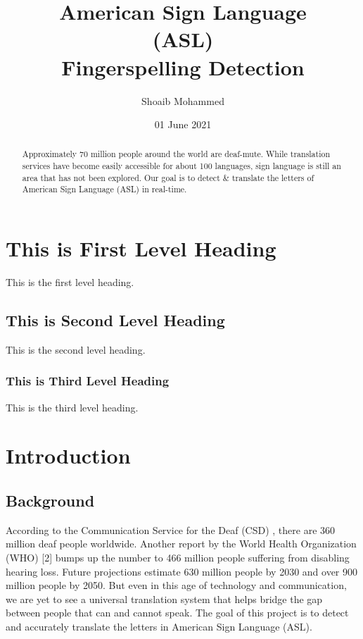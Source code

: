 \documentclass[twocolumn]{article}
\title{American Sign Language\\
	(ASL)\\
	Fingerspelling Detection}
\author{Shoaib Mohammed}
\date{01 June 2021}
\begin{document}
\begin{titlepage}
\maketitle
\thispagestyle{empty}
\end{titlepage}

\begin{abstract}
	Approximately 70 million people around the world are deaf-mute. While 
	translation services have become easily accessible for about 100 
	languages, sign language is still an area that has not been explored. 
	Our goal is to detect \& translate the letters of American Sign Language 
	(ASL) in real-time.
\end{abstract}

\section{This is First Level Heading}
This is the first level heading.

\subsection{This is Second Level Heading}
This is the second level heading.

\subsubsection{This is Third Level Heading}
This is the third level heading.

\section{Introduction}

\subsection{Background}
According to the Communication Service for the Deaf (CSD) \cite{csd}, there 
are 360 million deaf people worldwide. Another report by the World Health 
Organization (WHO) [2] bumps up the number to 466 million people suffering 
from disabling hearing loss. Future projections estimate 630 million people by 
2030 and over 900 million people by 2050. But even in this age of technology 
and communication, we are yet to see a universal translation system that helps 
bridge the gap between people that can and cannot speak. The goal of this 
project is to detect and accurately translate the letters in American Sign 
Language (ASL).
\end{document}
